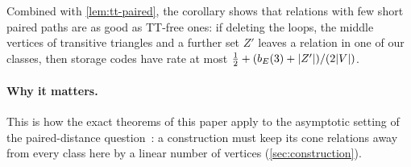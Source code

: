 Combined with \cref{lem:tt-paired}, the corollary shows that relations with
few short paired paths are as good as TT-free ones: if deleting the loops, the middle vertices of transitive triangles and
a further set $Z'$ leaves a relation in one of our classes, then storage codes have rate at most
$\frac12+(b_E(3)+\lvert Z' \rvert)/(2\lvert V \rvert)$.

\paragraph{Why it matters.} This is how the exact theorems of this paper apply to the asymptotic setting of the
paired-distance question~\cite[Question~9.1]{DirectedRecovery2026}: a construction must keep its cone relations away
from every class here by a linear number of vertices (\cref{sec:construction}).
